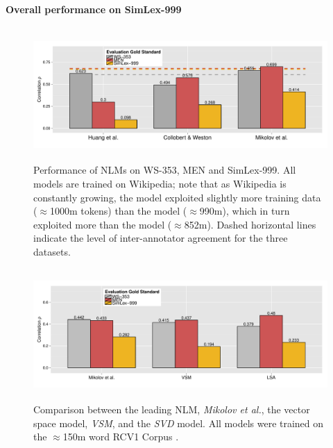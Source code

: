 \paragraph{\bf Overall performance on SimLex-999}
\label{assoc}

\begin{figure}[ht]  \includegraphics[width = \textwidth, height=5cm]{Chapter_2/Figure_2A_CL} \caption{\label{fig7}Performance of NLMs on WS-353, MEN and SimLex-999. All models are trained on Wikipedia; note that as Wikipedia is constantly growing, the \protect\cite{mikolov2013efficient} model exploited slightly more training data ($\approx$1000m tokens) than the \protect\cite{huang2012improving} model ($\approx$990m), which in turn exploited more than the \protect\cite{collobert2008unified} model ($\approx$852m). Dashed horizontal lines indicate the level of inter-annotator agreement for the three datasets.}\end{figure}

\begin{figure}[ht]  \includegraphics[width = \textwidth,height=5cm]{Chapter_2/Figure_2B_CL}  \caption{\label{fig8}Comparison between the leading NLM, \emph{Mikolov et al.}, the vector space model, \emph{VSM}, and the \emph{SVD} model. All models were trained on the $\approx$150m word RCV1 Corpus \protect\cite{lewis2004rcv1}.}\end{figure}

